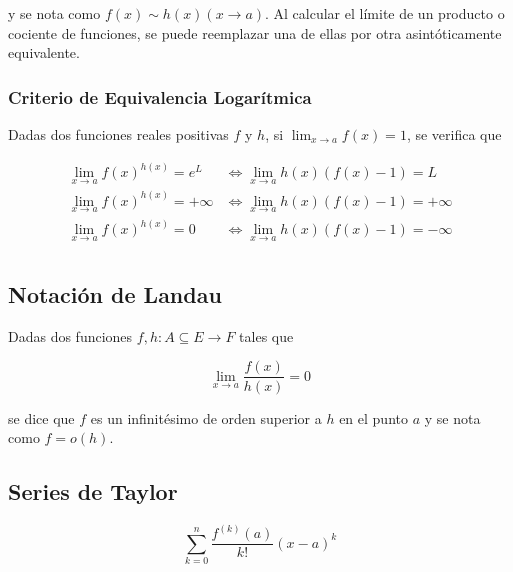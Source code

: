 y se nota como $f(x)\sim h(x)(x\to a)$. Al calcular el límite de un producto o cociente de funciones, se puede reemplazar una de ellas por otra asintóticamente equivalente.

\subsubsection{Criterio de Equivalencia Logarítmica}

Dadas dos funciones reales positivas $f$ y $h$, si $\lim_{x\to a}f(x) = 1$, se verifica que

\begin{equation}
\begin{split}
    \lim_{x\to a}f(x)^{h(x)} = e^L &\Leftrightarrow
    \lim_{x\to a}h(x)(f(x)-1) = L\\
    \lim_{x\to a}f(x)^{h(x)} = +\infty &\Leftrightarrow
    \lim_{x\to a}h(x)(f(x)-1) = +\infty\\
    \lim_{x\to a}f(x)^{h(x)} = 0 &\Leftrightarrow
    \lim_{x\to a}h(x)(f(x)-1) = -\infty\\
\end{split}
\nonumber
\end{equation}
\newpage
\subsection{Notación de Landau}

Dadas dos funciones $f, h:A\subseteq E \to F$ tales que

\[\lim_{x\to a}\frac{f(x)}{h(x)} = 0\]

se dice que $f$ es un infinitésimo de orden superior a $h$ en el punto $a$ y se nota como $f = o(h)$.

\subsection{Series de Taylor}

\[\sum^n_{k=0}\frac{f^{(k)}(a)}{k!}(x-a)^k\]

